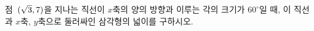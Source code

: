 점~$(\sqrt{3}{,}\mkern3mu\mathopen{}7)$을 지나는 직선이 $x$축의 양의 방향과 이루는 각의 크기가 $60^\circ$일 때, 이 직선과 $x$축, $y$축으로 둘러싸인 삼각형의 넓이를 구하시오.
